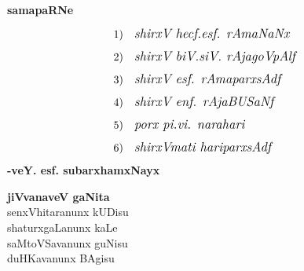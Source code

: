 

~
\medskip

\vfill

\thispagestyle{empty}

\begin{center}
{\Large\bfseries samapaRNe}
\end{center}
\bigskip

\begin{align*}
1) &~~~ \text{\large {\em shirxV hecf.esf. rAmaNaNx}}\\[0.2cm]
2) &~~~ \text{\large {\em shirxV biV.siV. rAjagoVpAlf}}\\[0.2cm]
3) &~~~ \text{\large {\em shirxV esf. rAmaparxsAdf}}\\[0.2cm]
4) &~~~ \text{\large {\em shirxV enf. rAjaBUSaNf}}\\[0.2cm]
5) &~~~\text{\large {\em porx pi.vi. narahari }}\\[0.2cm]
6) &~~~\text{\large {\em shirxVmati hariparxsAdf}}
\end{align*}
\hfill{\bf -veY. esf. subarxhamxNayx}                                                 

\vfill
\begin{center}
{\bf jiVvanaveV gaNita}\\
  senxVhitaranunx kUDisu\\
  shaturxgaLanunx kaLe\\
  saMtoVSavanunx guNisu\\
  duHKavanunx BAgisu
\end{center}
\vfill
\eject


